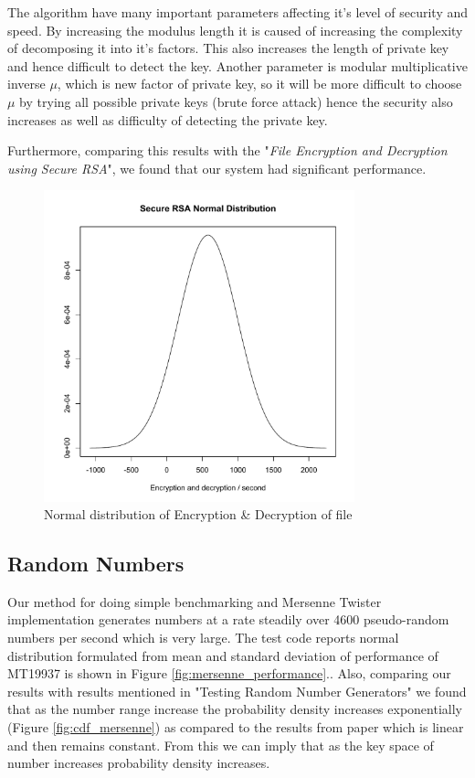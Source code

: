 \documentclass[conference]{IEEEtran}
\begin{document}
The algorithm have many important parameters affecting it's level of security and speed. By increasing the modulus length it is caused of increasing the complexity of decomposing it into it's factors. This also increases the length of private key and hence difficult to detect the key. Another parameter is modular multiplicative inverse $\mu$, which is new factor of private key, so it will be more difficult to choose $\mu$ by trying all possible private keys (brute force attack) hence the security also increases as well as difficulty of detecting the private key.


Furthermore, comparing this results with the "\emph{File Encryption and Decryption using Secure RSA}"\cite{securersa}, we found that our system had significant performance.


\begin{figure}[ht!]
\centering
\includegraphics[width=90mm]{images/rsaPlot.pdf}
\caption{Normal distribution of Encryption \& Decryption of file}
\label{fig:rsa_cdf}
\end{figure}

\subsection{{\large Random Numbers}}
Our method for doing simple benchmarking and Mersenne Twister implementation generates numbers at a rate steadily over 4600 pseudo-random numbers per second which is very large. The test code reports normal distribution formulated from mean and standard deviation of performance of MT19937 is shown in Figure \ref{fig:mersenne_performance}.\cite{wolfram_mt}. Also, comparing our results with results mentioned in "Testing Random Number Generators"\cite{lcg_cdf} we found that as the number range increase the probability density increases exponentially (Figure \ref{fig:cdf_mersenne}) as compared to the results from paper\cite{lcg_cdf} which is linear and then remains constant. From this we can imply that as the key space of number increases probability density increases.
\end{document}
